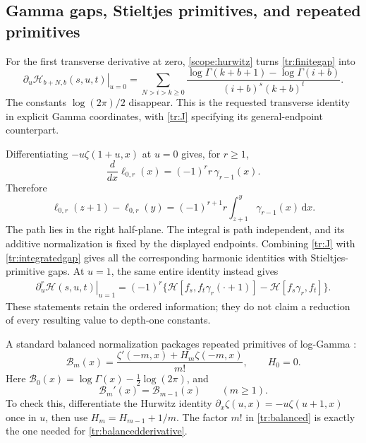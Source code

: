 \documentclass[11pt,letterpaper]{article}
\numberwithin{equation}{section}
\theoremstyle{plain}
\theoremstyle{definition}
\theoremstyle{remark}
\newcommand{\dd}{\,\mathrm d}
\newcommand{\HH}{\mathcal H}
\begin{document}
\subsection{Gamma gaps, Stieltjes primitives, and repeated primitives}

For the first transverse derivative at zero, \eqref{scope:hurwitz}
turns \eqref{tr:finitegap} into
\begin{equation}\label{tr:logGammafinite}
 \left.\partial_u\HH_{b+N,b}(s,u,t)\right|_{u=0}
 =
 \sum_{N>i>k\geq0}
 \frac{\log\Gamma(k+b+1)-\log\Gamma(i+b)}
      {(i+b)^s(k+b)^t}.
\end{equation}
The constants $\log(2\pi)/2$ disappear. This is the requested transverse
identity in explicit Gamma coordinates, with \eqref{tr:J} specifying
its general-endpoint counterpart.

Differentiating $-\!u\zeta(1+u,x)$ at $u=0$ gives, for $r\geq1$,
\begin{equation}\label{tr:Stieltjesprimitive}
 \frac{d}{dx}\ell_{0,r}(x)=(-1)^r r\,\gamma_{r-1}(x).
\end{equation}
Therefore
\begin{equation}\label{tr:integratedgap}
 \ell_{0,r}(z+1)-\ell_{0,r}(y)
   =(-1)^{r+1}r\int_{z+1}^{y}\gamma_{r-1}(x)\dd x.
\end{equation}
The path lies in the right half-plane. The integral is path independent,
and its additive normalization is fixed by the displayed endpoints.
Combining \eqref{tr:J} with \eqref{tr:integratedgap} gives all the
corresponding harmonic identities with Stieltjes-primitive gaps.
At $u=1$, the same entire identity instead gives
\begin{align}
 \left.\partial_u^r\HH(s,u,t)\right|_{u=1}
 =(-1)^r\bigl\{\HH[f_s,f_t\gamma_r(\cdot+1)]
                 -\HH[f_s\gamma_r,f_t]\bigr\}.
 \label{tr:Stieltjesgap}
\end{align}
These statements retain the ordered information; they do not claim
a reduction of every resulting value to depth-one constants.

A standard balanced normalization packages repeated primitives of
log-Gamma \cite{EspinosaMoll}:
\begin{equation}\label{tr:balanced}
 \mathcal B_m(x)=
       \frac{\zeta'(-m,x)+H_m\zeta(-m,x)}{m!},\qquad H_0=0.
\end{equation}
Here $\mathcal B_0(x)=\log\Gamma(x)-\tfrac12\log(2\pi)$, and
\begin{equation}\label{tr:balancedderivative}
 \mathcal B_m'(x)=\mathcal B_{m-1}(x)\qquad(m\geq1).
\end{equation}
To check this, differentiate the Hurwitz identity
$\partial_x\zeta(u,x)=-u\zeta(u+1,x)$ once in $u$, then use
$H_m=H_{m-1}+1/m$. The factor $m!$ in \eqref{tr:balanced} is
exactly the one needed for \eqref{tr:balancedderivative}.
\end{document}

